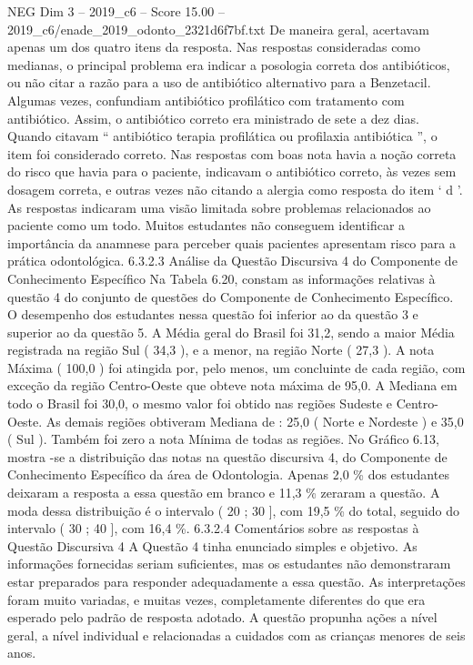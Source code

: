 \begin{textsample}{NEG Dim 3 – 2019\_c6 – Score 15.00 – 2019\_c6/enade\_2019\_odonto\_2321d6f7bf.txt}
De maneira geral, acertavam apenas um dos quatro itens da resposta.
Nas respostas consideradas como medianas, o principal problema era indicar a posologia correta dos antibióticos, ou não citar a razão para a uso de antibiótico alternativo para a Benzetacil.
Algumas vezes, confundiam antibiótico profilático com tratamento com antibiótico.
Assim, o antibiótico correto era ministrado de sete a dez dias.
Quando citavam “ antibiótico terapia profilática ou profilaxia antibiótica ”, o item foi considerado correto.
Nas respostas com boas nota havia a noção correta do risco que havia para o paciente, indicavam o antibiótico correto, às vezes sem dosagem correta, e outras vezes não citando a alergia como resposta do item ‘ d ’.
As respostas indicaram uma visão limitada sobre problemas relacionados ao paciente como um todo.
Muitos estudantes não conseguem identificar a importância da anamnese para perceber quais pacientes apresentam risco para a prática odontológica. 6.3.2.3 Análise da Questão Discursiva 4 do Componente de Conhecimento Específico Na Tabela 6.20, constam as informações relativas à questão 4 do conjunto de questões do Componente de Conhecimento Específico.
O desempenho dos estudantes nessa questão foi inferior ao da questão 3 e superior ao da questão 5.
A Média geral do Brasil foi 31,2, sendo a maior Média registrada na região Sul ( 34,3 ), e a menor, na região Norte ( 27,3 ).
A nota Máxima ( 100,0 ) foi atingida por, pelo menos, um concluinte de cada região, com exceção da região Centro-Oeste que obteve nota máxima de 95,0.
A Mediana em todo o Brasil foi 30,0, o mesmo valor foi obtido nas regiões Sudeste e Centro-Oeste.
As demais regiões obtiveram Mediana de : 25,0 ( Norte e Nordeste ) e 35,0 ( Sul ).
Também foi zero a nota Mínima de todas as regiões.
No Gráfico 6.13, mostra -se a distribuição das notas na questão discursiva 4, do Componente de Conhecimento Específico da área de Odontologia.
Apenas 2,0 \% dos estudantes deixaram a resposta a essa questão em branco e 11,3 \% zeraram a questão.
A moda dessa distribuição é o intervalo ( 20 ; 30 ], com 19,5 \% do total, seguido do intervalo ( 30 ; 40 ], com 16,4 \%. 6.3.2.4 Comentários sobre as respostas à Questão Discursiva 4 A Questão 4 tinha enunciado simples e objetivo.
As informações fornecidas seriam suficientes, mas os estudantes não demonstraram estar preparados para responder adequadamente a essa questão.
As interpretações foram muito variadas, e muitas vezes, completamente diferentes do que era esperado pelo padrão de resposta adotado.
A questão propunha ações a nível geral, a nível individual e relacionadas a cuidados com as crianças menores de seis anos.

\end{textsample}
